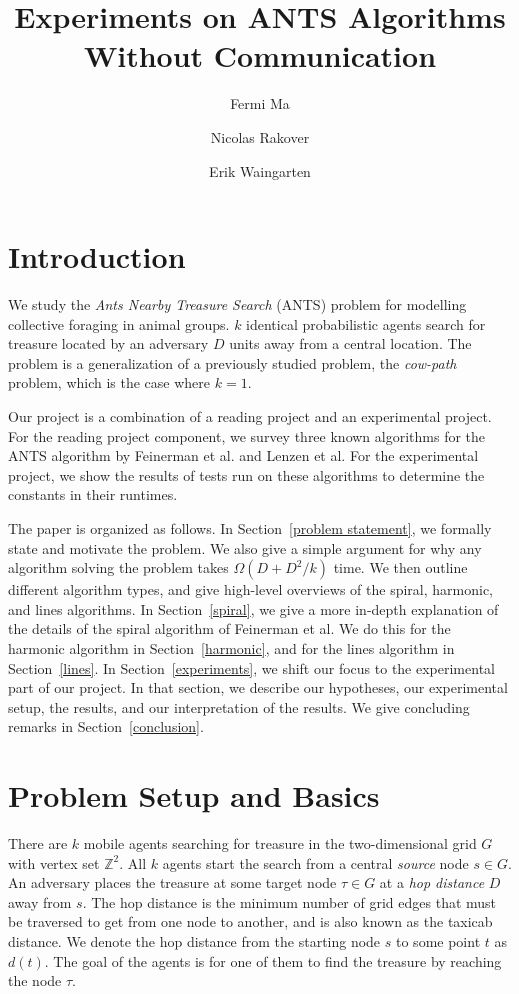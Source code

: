 \documentclass[runningheads,a4paper]{llncs}
\begin{document}
\mainmatter  

\title{Experiments on ANTS Algorithms Without Communication}
\author{Fermi Ma \and Nicolas Rakover \and Erik Waingarten}

\maketitle

\section{Introduction}

We study the \emph{Ants Nearby Treasure Search} (ANTS) problem for modelling collective foraging in animal groups. $k$ identical probabilistic agents search for treasure located by an adversary $D$ units away from a central location. The problem is a generalization of a previously studied problem, the \emph{cow-path} problem, which is the case where $k = 1$. 

Our project is a combination of a reading project and an experimental project. For the reading project component, we survey three known algorithms for the ANTS algorithm by Feinerman et al. and Lenzen et al. For the experimental project, we show the results of tests run on these algorithms to determine the constants in their runtimes.

The paper is organized as follows. In Section~\ref{problem statement}, we formally state and motivate the problem. We also give a simple argument for why any algorithm solving the problem takes $\Omega(D+D^2/k)$ time. We then outline different algorithm types, and give high-level overviews of the spiral, harmonic, and lines algorithms. In Section~\ref{spiral}, we give a more in-depth explanation of the details of the spiral algorithm of Feinerman et al. We do this for the harmonic algorithm in Section~\ref{harmonic}, and for the lines algorithm in Section~\ref{lines}. In Section~\ref{experiments}, we shift our focus to the experimental part of our project. In that section, we describe our hypotheses, our experimental setup, the results, and our interpretation of the results. We give concluding remarks in Section~\ref{conclusion}. 

\section{Problem Setup and Basics}
\label{problem statment}

There are $k$ mobile agents searching for treasure in the two-dimensional grid $G$ with vertex set $\mathbb{Z}^2$. All $k$ agents start the search from a central \emph{source} node $s \in G$. An adversary places the treasure at some target node $\tau \in G$ at a \emph{hop distance} $D$ away from $s$. The hop distance is the minimum number of grid edges that must be traversed to get from one node to another, and is also known as the taxicab distance. We denote the hop distance from the starting node $s$ to some point $t$ as $d(t)$. The goal of the agents is for one of them to find the treasure by reaching the node $\tau$.
\end{document}
